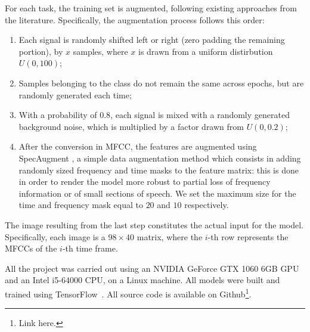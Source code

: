 For each task, the training set is augmented, following existing approaches from the literature. Specifically, the augmentation process follows this order:
\begin{enumerate}
	\item Each signal is randomly shifted left or right (zero padding the remaining portion), by $x$ samples, where $x$ is drawn from a uniform distirbution $U(0,100)$;
	\item Samples belonging to the  class do not remain the same across epochs, but are randomly generated each time;
	\item With a probability of $0.8$, each signal is mixed with a randomly generated background noise, which is multiplied by a factor drawn from $U(0,0.2)$; 
	\item After the conversion in MFCC, the features are augmented using SpecAugment \cite{park2019specaugment}, a simple data augmentation method which consists in adding randomly sized frequency and time masks to the feature matrix: this is done in order to render the model more robust to partial loss of frequency information or of small sections of speech. We set the maximum size for the time and frequency mask equal to $20$ and $10$ respectively.
\end{enumerate}

The image resulting from the last step constitutes the actual input for the model. Specifically, each image is a $98 \times 40$ matrix, where the $i$-th row represents the MFCCs of the $i$-th time frame. 


All the project was carried out using an NVIDIA GeForce GTX 1060 6GB GPU and an Intel i5-64000 CPU, on a Linux machine. All models were built and trained using TensorFlow~\cite{Abadi2016TensorFlowAS}. All source code is available on Github\footnote{Link here.}. %

